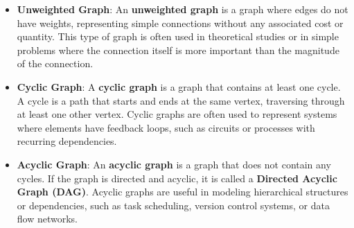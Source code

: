 \documentclass{book}
\begin{document}
\begin{itemize}
    \item \textbf{Unweighted Graph}: An \textbf{unweighted graph} is a graph where edges do not have weights, representing simple connections without any associated cost or quantity. This type of graph is often used in theoretical studies or in simple problems where the connection itself is more important than the magnitude of the connection.
    
    
    \item \textbf{Cyclic Graph}: A \textbf{cyclic graph} is a graph that contains at least one cycle. A cycle is a path that starts and ends at the same vertex, traversing through at least one other vertex. Cyclic graphs are often used to represent systems where elements have feedback loops, such as circuits or processes with recurring dependencies.
    
    
    \item \textbf{Acyclic Graph}: An \textbf{acyclic graph} is a graph that does not contain any cycles. If the graph is directed and acyclic, it is called a \textbf{Directed Acyclic Graph (DAG)}. Acyclic graphs are useful in modeling hierarchical structures or dependencies, such as task scheduling, version control systems, or data flow networks.
    
\end{itemize}
\end{document}

